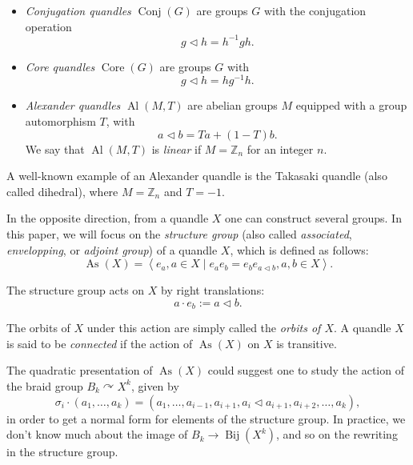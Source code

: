 \documentclass[a4paper,11pt]{amsart}
\theoremstyle{definition}
\newcommand{\Z}{{\mathbb Z}}
\DeclareMathOperator{\Al}{Al}
\DeclareMathOperator{\Core}{Core}
\DeclareMathOperator{\As}{As}
\DeclareMathOperator{\Conj}{Conj}
\DeclareMathOperator{\Bij}{Bij}
\newcommand{\znz}[1]{\Z_{#1}}
\begin{document}
\begin{itemize}
\item \emph{Conjugation quandles} $\Conj(G)$ are groups $G$ with the conjugation operation
\[
g\lhd h = h^{-1} g h.
\]
\item \emph{Core quandles} $\Core(G)$ are groups $G$ with
\[
g\lhd h = h g^{-1} h.
\]
\item \emph{Alexander quandles} $\Al(M,T)$ are abelian groups $M$ equipped with a group automorphism $T$, with
\[
a\lhd b = Ta + (1-T)b.\] 
We say that $\Al(M,T)$ is \emph{linear} if $M=\znz{n}$ for an integer $n$.
\end{itemize}

A well-known example of an Alexander quandle is the Takasaki quandle (also called dihedral), where $M=\znz{n}$ and $T=-1$.

In the opposite direction, from a quandle $X$ one can construct several groups.
In this paper, we will focus on the \emph{structure group} (also called \emph{associated}, \emph{envelopping}, or \emph{adjoint group}) of a quandle $X$, which is defined as follows:
\[
\As(X) = \left< e_a, a\in X \mid e_a e_b = e_b e_{a\lhd b}, a,b\in X \right>.
\]

The structure group acts on $X$ by right translations:
\[a \cdot e_b := a\lhd b.\]

The orbits of $X$ under this action are simply called the \emph{orbits of $X$}.
A quandle $X$ is said to be \emph{connected} if the action of $\As(X)$ on $X$ is transitive.


The quadratic presentation of $\As(X)$ could suggest one to study the action of the braid group $B_k\curvearrowright X^k$, given by 
\[
\sigma_i\cdot (a_1,\ldots, a_k) = (a_1,\ldots, a_{i-1}, a_{i+1}, a_i\lhd a_{i+1}, a_{i+2}, \ldots, a_k),
\]
in order to get a normal form for elements of the structure group.
In practice, we don't know much about the image of $B_k \to \Bij(X^k)$, and so on the rewriting in the structure group.
\end{document}
